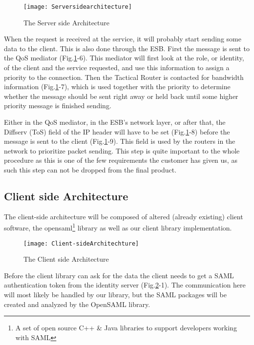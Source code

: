         \begin{figure}[htb]
            \texttt{[image: Serversidearchitecture]}
            \caption{The Server side Architecture}
            \label{fig:Serversidearchitecture}
        \end{figure}

        When the request is received at the service, it will probably start sending some data to the client. This is also done through the ESB. First the message is sent to the QoS mediator (Fig.\ref{fig:Serversidearchitecture}-6). This mediator will first look at the role, or identity, of the client and the service requested, and use this information to assign a priority to the connection. Then the Tactical Router is contacted for bandwidth information (Fig.\ref{fig:Serversidearchitecture}-7), which is used together with the priority to determine whether the message should be sent right away or held back until some higher priority message is finished sending.

        Either in the QoS mediator, in the ESB’s network layer, or after that, the Diffserv (ToS) field of the IP header will have to be set (Fig.\ref{fig:Serversidearchitecture}-8) before the message is sent to the client (Fig.\ref{fig:Serversidearchitecture}-9). This field is used by the routers in the network to prioritize packet sending. This step is quite important to the whole procedure as this is one of the few requirements the customer has given us, as such this step can not be dropped from the final product.
 
    \subsection{Client side Architecture}\label{Client side Architecture} 
    
        The client-side architecture will be composed of altered (already existing) client software, the \gls{opensaml}\footnote{A set of open source C++ & Java libraries to support developers working with SAML} library as well as our client library implementation.
        
        \begin{figure}[htb]
            \centering
            \texttt{[image: Client-sideArchitechture]}
            \caption{The Client side Architecture}
            \label{fig:Client-sideArchitechture}
        \end{figure}
 
        Before the client library can ask for the data the client needs to get a SAML authentication token from the identity server (Fig.\ref{fig:Client-sideArchitechture}-1). The communication here will most likely be handled by our library, but the SAML packages will be created and analyzed by the OpenSAML library. 

